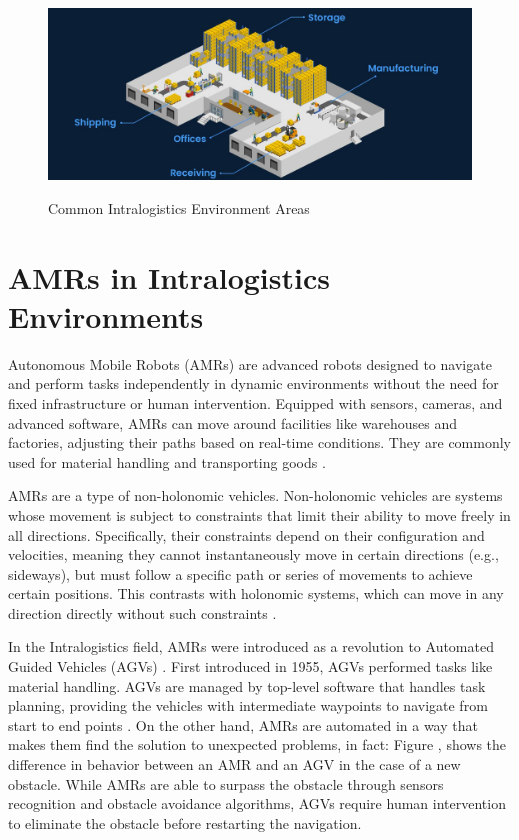 \begin{figure}[H]
    \begin{center}
        \includegraphics[width=6in]{images/Chap1/common-warehouse-areas.jpg}\\
        \caption{Common Intralogistics Environment Areas \cite{R46}}
        \label{Areas}
        \end{center}
\end{figure}

\section{AMRs in Intralogistics Environments}
Autonomous Mobile Robots (AMRs) are advanced robots designed to navigate and perform tasks independently 
in dynamic environments without the need for fixed infrastructure or human intervention. Equipped with 
sensors, cameras, and advanced software, AMRs can move around facilities like warehouses and 
factories, adjusting their paths based on real-time conditions. They are commonly used 
for material handling and transporting goods \cite{R7}.

AMRs are a type of non-holonomic vehicles. Non-holonomic vehicles are systems whose movement is subject 
to constraints that limit their ability to move freely in all directions. Specifically, their constraints 
depend on their configuration and velocities, meaning they cannot instantaneously move in certain directions 
(e.g., sideways), but must follow a specific path or series of movements to achieve certain positions. 
This contrasts with holonomic systems, which can move in any direction directly without such constraints \cite{R28}.

In the Intralogistics field, AMRs were introduced as a revolution to Automated Guided Vehicles (AGVs) \cite{R7}. 
First introduced in 1955, AGVs performed tasks like 
material handling. AGVs are managed by top-level software that handles task planning, 
providing the vehicles with intermediate waypoints to navigate from start to end points \cite{R7}.
On the other hand, AMRs are automated in a way that makes them find the solution to unexpected problems, 
in fact:
Figure , shows the difference in behavior between an AMR and an AGV in the case of a 
new obstacle. While AMRs are able to surpass the obstacle through sensors recognition and obstacle 
avoidance algorithms, AGVs require human intervention to eliminate the obstacle before restarting the navigation.

